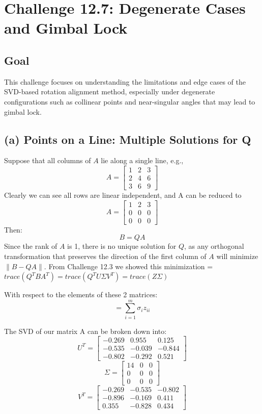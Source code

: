 \documentclass[12pt]{article}
\begin{document}
\section*{Challenge 12.7: Degenerate Cases and Gimbal Lock}

\subsection*{Goal}
This challenge focuses on understanding the limitations and edge cases of the SVD-based rotation alignment method, especially under degenerate configurations such as collinear points and near-singular angles that may lead to gimbal lock.

\subsection*{(a) Points on a Line: Multiple Solutions for Q}
Suppose that all columns of \( A \) lie along a single line, e.g.,
\[
A = \begin{bmatrix} 1 & 2 & 3 \\ 2 & 4 & 6 \\ 3 & 6 & 9 \end{bmatrix}
\]
Clearly we can see all rows are linear independent, and A can be reduced to
\[
A = \begin{bmatrix} 1 & 2 & 3 \\ 0 & 0 & 0 \\ 0 & 0 & 0 \end{bmatrix}
\]
Then:
\[
B = QA
\]
Since the rank of \( A \) is 1, there is no unique solution for \( Q \), as any orthogonal transformation that preserves the direction of the first column of \( A \) will minimize \( \| B - QA \| \). From Challenge 12.3 we showed this minimization = $trace(Q^TBA^T) = trace(Q^TU\Sigma V^T) = trace(Z\Sigma)$\newline

With respect to the elements of these 2 matrices:
\[= \sum_{i=1}^{m} \sigma_iz_{ii}\]

The SVD of our matrix A can be broken down into:
\[
U^T = \begin{bmatrix} -0.269 & 0.955 & 0.125 \\ -0.535 & -0.039 & -0.844 \\ -0.802 & -0.292 & 0.521 \end{bmatrix}
\]
\[
\Sigma = \begin{bmatrix} 14 & 0 & 0 \\ 0 & 0 & 0 \\ 0 & 0 & 0 \end{bmatrix}
\]
\[
V^T = \begin{bmatrix} -0.269 & -0.535 & -0.802 \\ -0.896 & -0.169 & 0.411 \\ 0.355 & -0.828 & 0.434 \end{bmatrix}
\]
\end{document}

